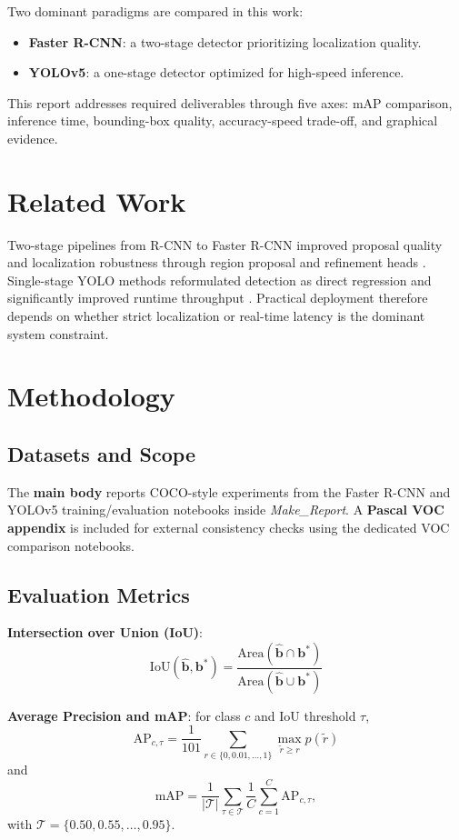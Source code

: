 \documentclass[conference]{IEEEtran}
\begin{document}
Two dominant paradigms are compared in this work:
\begin{itemize}
	\item \textbf{Faster R-CNN}: a two-stage detector prioritizing localization quality.
	\item \textbf{YOLOv5}: a one-stage detector optimized for high-speed inference.
\end{itemize}

This report addresses required deliverables through five axes: mAP comparison, inference time, bounding-box quality, accuracy-speed trade-off, and graphical evidence.

\section{Related Work}
Two-stage pipelines from R-CNN to Faster R-CNN improved proposal quality and localization robustness through region proposal and refinement heads \cite{ren2015faster}. Single-stage YOLO methods reformulated detection as direct regression and significantly improved runtime throughput \cite{redmon2016you,yolov5}. Practical deployment therefore depends on whether strict localization or real-time latency is the dominant system constraint.

\section{Methodology}
\subsection{Datasets and Scope}
The \textbf{main body} reports COCO-style experiments from the Faster R-CNN and YOLOv5 training/evaluation notebooks inside \textit{Make\_Report}. A \textbf{Pascal VOC appendix} is included for external consistency checks using the dedicated VOC comparison notebooks.

\subsection{Evaluation Metrics}
\textbf{Intersection over Union (IoU)}:
\begin{equation}
\mathrm{IoU}(\hat{\mathbf{b}},\mathbf{b}^{*})=
\frac{\mathrm{Area}(\hat{\mathbf{b}}\cap\mathbf{b}^{*})}{\mathrm{Area}(\hat{\mathbf{b}}\cup\mathbf{b}^{*})}
\end{equation}

\textbf{Average Precision and mAP}: for class $c$ and IoU threshold $\tau$,
\begin{equation}
\mathrm{AP}_{c,\tau}=\frac{1}{101}\sum_{r\in\{0,0.01,\dots,1\}}\max_{\tilde r\ge r}p(\tilde r)
\end{equation}
and
\begin{equation}
\mathrm{mAP}=\frac{1}{|\mathcal{T}|}\sum_{\tau\in\mathcal{T}}\frac{1}{C}\sum_{c=1}^{C}\mathrm{AP}_{c,\tau},
\end{equation}
with $\mathcal{T}=\{0.50,0.55,\dots,0.95\}$.
\end{document}
